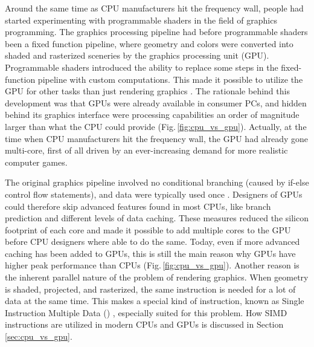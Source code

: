 Around the same time as CPU manufacturers hit the frequency wall, people had started experimenting with programmable shaders in the field of graphics programming. The graphics processing pipeline had before programmable shaders been a fixed function pipeline, where geometry and colors were converted into shaded and rasterized sceneries by the graphics processing unit (GPU). Programmable shaders introduced the ability to replace some steps in the fixed-function pipeline with custom computations. This made it possible to utilize the GPU for other tasks than just rendering graphics \cite{Seland2007}. The rationale behind this development was that GPUs were already available in consumer PCs, and hidden behind its graphics interface were processing capabilities an order of magnitude larger than what the CPU could provide (Fig.\,\ref{fig:cpu_vs_gpu}). Actually, at the time when CPU manufacturers hit the frequency wall, the GPU had already gone multi-core, first of all driven by an ever-increasing demand for more realistic computer games. 

The original graphics pipeline involved no conditional branching (caused by if-else control flow statements), and data were typically used once \cite{Purcell2002}. Designers of GPUs could therefore skip advanced features found in most CPUs, like branch prediction and different levels of data caching. These measures reduced the silicon footprint of each core and made it possible to add multiple cores to the GPU before CPU designers where able to do the same. Today, even if more advanced caching has been added to GPUs, this is still the main reason why GPUs have higher peak performance than CPUs (Fig.\,\ref{fig:cpu_vs_gpu}). Another reason is the inherent parallel nature of the problem of rendering graphics. When geometry is shaded, projected, and rasterized, the same instruction is needed for a lot of data at the same time. This makes a special kind of instruction, known as Single Instruction Multiple Data () \cite{Flynn1966}, especially suited for this problem. How SIMD instructions are utilized in modern CPUs and GPUs is discussed in Section \ref{sec:cpu_vs_gpu}.

